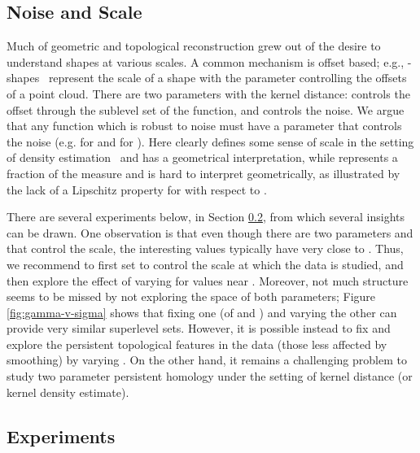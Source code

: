 \documentclass[11pt]{myclass}
\begin{document}
\subsection{Noise and Scale}
Much of geometric and topological reconstruction grew out of the desire to understand shapes at various scales.  A common mechanism is offset based; e.g., -shapes~\cite{Edelsbrunner1993} represent the scale of a shape with the  parameter controlling the offsets of a point cloud.  
There are two parameters with the kernel distance:  controls the offset through the sublevel set of the function, and  controls the noise. 
We argue that any function which is robust to noise must have a parameter that controls the noise (e.g.  for  and  for ).
Here  clearly defines some sense of scale in the setting of density estimation~\cite{Sil86} and has a geometrical interpretation, while  represents a fraction of the measure and is hard to interpret geometrically, as illustrated by the lack of a Lipschitz property for  with respect to .  

There are several experiments below, in Section \ref{sec:exp}, 
from which several insights can be drawn.  
One observation is that even though there are two parameters  and  that control the scale, the interesting values typically have  very close to .  
Thus, we recommend to first set  to control the scale at which the data is studied, and then explore the effect of varying  for values near .  
Moreover, not much structure seems to be missed by not exploring the space of both parameters; 
Figure \ref{fig:gamma-v-sigma} shows that fixing one (of  and ) and varying the other can provide very similar superlevel sets.  
However, it is possible instead to fix  and explore the persistent topological features in the data \cite{EdelsbrunnerLetscherZomorodian2002,EdelsbrunnerHarer2008} (those less affected by smoothing) by varying .  
On the other hand, it remains a challenging problem to study two parameter persistent homology \cite{CarlssonZomorodian2007,CarlssonSinghZomorodian2009} under the setting of kernel distance (or kernel density estimate). 













\subsection{Experiments}
\label{sec:exp}
\end{document}
